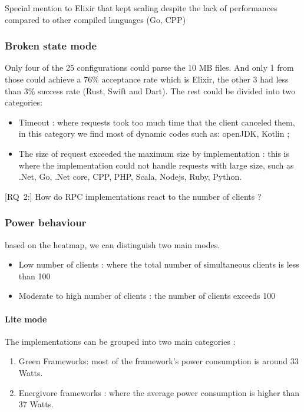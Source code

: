 Special mention to Elixir that kept scaling despite the lack of performances compared  to other compiled languages (Go, CPP)

\subsubsection{Broken state mode }
Only four of the 25 configurations could parse the 10 MB files. And only 1 from those could achieve a 76\% acceptance rate which is Elixir, the other 3 had less than 3\% success rate (Rust, Swift and Dart).
The rest could be divided into two categories:
\begin{itemize}
    \item Timeout : where requests took too much time that the client canceled them, in this category we find most of dynamic codes such as: openJDK, Kotlin ;
    \item The size of request exceeded the maximum size by implementation : this is where the implementation could not handle requests with large size, such as .Net, Go, .Net core, CPP, PHP, Scala, Nodejs, Ruby, Python.
\end{itemize}


[\textsc{RQ}~2:] How do RPC implementations react to the number of clients ?

\subsubsection{Power behaviour}
based on the heatmap, we can distinguish two main modes.
\begin{itemize}
    \item Low number of clients : where the total number of simultaneous clients is less than 100
    \item Moderate to high number of clients : the number of clients exceeds 100
\end{itemize}


\paragraph{Lite mode}
The implementations can be grouped into two main categories :
\begin{enumerate}
    \item Green Frameworks: most of the framework's power consumption is around 33 Watts.
    \item Energivore frameworks : where the average power consumption is higher than 37 Watts.
\end{enumerate}

